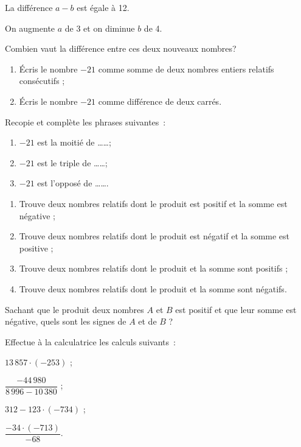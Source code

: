 \begin{exercice}
La différence $a - b$ est égale à 12.

On augmente $a$ de 3 et on diminue $b$ de 4.

Combien vaut la différence entre ces deux nouveaux nombres? 
\end{exercice}


\begin{exercice}
\begin{enumerate}
 \item Écris le nombre $- 21$ comme somme de deux nombres entiers relatifs consécutifs ;
 \item Écris le nombre $- 21$ comme différence de deux carrés.
 \end{enumerate}
\end{exercice}


\begin{exercice}
Recopie et complète les phrases suivantes :
\begin{enumerate}
 \item $- 21$ est la moitié de \ldots \ldots ;
 \item $- 21$ est le triple de \ldots \ldots ;
 \item $- 21$ est l'opposé de \ldots \ldots.
 \end{enumerate}
\end{exercice}


\begin{exercice}
\begin{enumerate}
 \item Trouve deux nombres relatifs dont le produit est positif et la somme est négative ;
 \item Trouve deux nombres relatifs dont le produit est négatif et la somme est positive ;
 \item Trouve deux nombres relatifs dont le produit et la somme sont positifs ;
 \item Trouve deux nombres relatifs dont le produit et la somme sont négatifs.
 \end{enumerate}
\end{exercice}


\begin{exercice}[Énigme]
Sachant que le produit deux nombres $A$ et $B$ est positif et que leur somme est négative, quels sont les signes de $A$ et de $B$ ?
\end{exercice}


\begin{exercice}[Calculatrice]
Effectue à la calculatrice les calculs suivants :
\begin{colenumerate}{2}
 \item $13\,857 \cdot (- 253)$ ;
 \item $\dfrac{- 44\,980}{8\,996 - 10\,380}$ ;
 \item $312 - 123 \cdot (- 734)$ ;
 \item $\dfrac{- 34 \cdot (- 713)}{- 68}$.
 \end{colenumerate}
\end{exercice}


